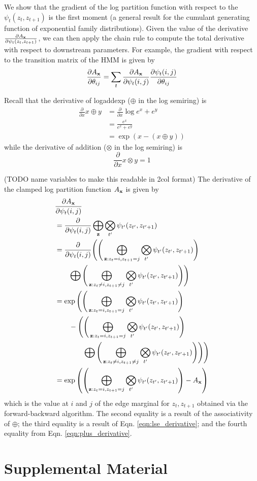 \documentclass[11pt,a4paper]{article}
\begin{document}
We show that the gradient of the log partition function with respect to the $\psi_t(z_t, z_{t+1})$
is the first moment (a general result for the cumulant generating function
of exponential family distributions). Given the value of the derivative
$\frac{\partial A_{\mathbf{x}}}{\partial \psi_t(z_t, z_{t+1})}$,
we can then apply the chain rule to compute the total derivative with respect to
downstream parameters. For example, the gradient with respect to the transition matrix
of the HMM is given by
$$\frac{\partial A_{\mathbf{x}}}{\partial \theta_{ij}}
= \sum_t \frac{\partial A_{\mathbf{x}}}{\partial \psi_t(i,j)}
\frac{\partial \psi_t(i,j)}{\partial \theta_{ij}}$$

Recall that the derivative of logaddexp ($\oplus$ in the log semiring) is
\begin{equation}
\label{eqn:lse_derivative}
\begin{aligned}
\frac{\partial}{\partial x} x \oplus y
&= \frac{\partial}{\partial x} \log e^x + e^ y\\
&= \frac{e^x}{e^x + e^y}\\
&= \exp(x - (x \oplus y))
\end{aligned}
\end{equation}
while the derivative of addition ($\otimes$ in the log semiring) is
\begin{equation}
\label{eqn:plus_derivative}
\frac{\partial}{\partial x} x \otimes y = 1
\end{equation}

(TODO name variables to make this readable in 2col format)
The derivative of the clamped log partition function $A_{\mathbf{x}}$ is given by
\begin{align*}
&\frac{\partial A_{\mathbf{x}}}{\partial \psi_t(i,j)}\\
&= \frac{\partial}{\partial \psi_t(i,j)} \bigoplus_{\mathbf{z}}
    \bigotimes_{t'} \psi_{t'}(z_{t'}, z_{t'+1})\\
&= \frac{\partial}{\partial \psi_t(i,j)} \Bigg(
        \Bigg(\bigoplus_{\mathbf{z}:z_t = i, z_{t+1} = j}
        \bigotimes_{t'} \psi_{t'}(z_{t'}, z_{t'+1})\Bigg)\\
& \qquad \bigoplus
        \Bigg(\bigoplus_{\mathbf{z}:z_t \ne i, z_{t+1} \ne j}
        \bigotimes_{t'} \psi_{t'}(z_{t'}, z_{t'+1})\Bigg)
    \Bigg)\\
&= \exp\Bigg(\Bigg(\bigoplus_{\mathbf{z}:z_t = i, z_{t+1} = j} 
    \bigotimes_{t'} \psi_{t'}(z_{t'}, z_{t'+1})\Bigg)\\
&\qquad - \Bigg(\Bigg(\bigoplus_{\mathbf{z}:z_t = i, z_{t+1} = j}
        \bigotimes_{t'} \psi_{t'}(z_{t'}, z_{t'+1})\Bigg)\\
    &\qquad \qquad \bigoplus
        \Bigg(\bigoplus_{\mathbf{z}:z_t \ne i, z_{t+1} \ne j}
        \bigotimes_{t'} \psi_{t'}(z_{t'}, z_{t'+1})\Bigg)
    \Bigg)\Bigg)\\
&= \exp\left(\left(\bigoplus_{\mathbf{z}:z_t = i, z_{t+1} = j} 
    \bigotimes_{t'} \psi_{t'}(z_{t'}, z_{t'+1})\right)
    - A_{\mathbf{x}}\right)
\end{align*} 
which is the value at $i$ and $j$ of the
edge marginal for $z_t, z_{t+1}$ obtained via the forward-backward algorithm.
The second equality is a result of the associativity of $\oplus$;
the third equality is a result of Eqn. \ref{eqn:lse_derivative};
and the fourth equality from Eqn. \ref{eqn:plus_derivative}.


\section{Supplemental Material}
\label{sec:supplemental}
\end{document}
